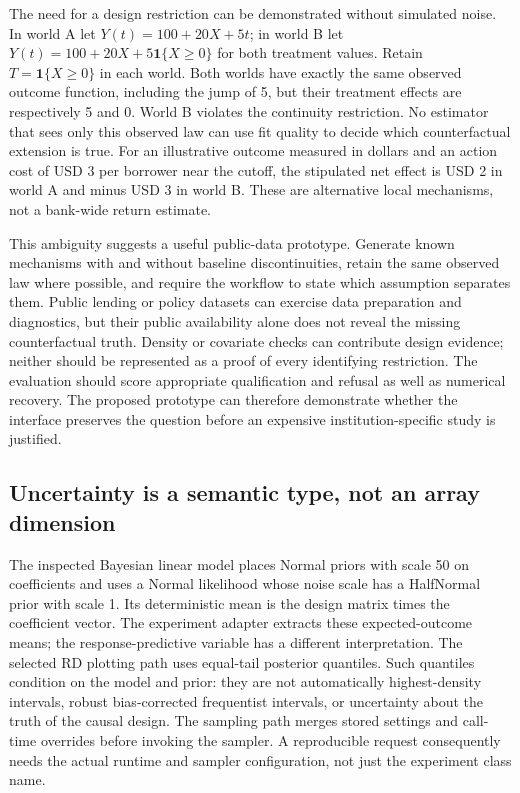The need for a design restriction can be demonstrated without simulated noise.
In world A let $Y(t)=100+20X+5t$; in world B let
$Y(t)=100+20X+5\mathbf{1}\{X\geq0\}$ for both treatment values. Retain
$T=\mathbf{1}\{X\geq0\}$ in each world. Both worlds have exactly the same
observed outcome function, including the jump of 5, but their treatment effects
are respectively 5 and 0. World B violates the continuity restriction. No
estimator that sees only this observed law can use fit quality to decide which
counterfactual extension is true. For an illustrative outcome measured in dollars
and an action cost of USD 3 per borrower near the cutoff, the stipulated net
effect is USD 2 in world A and minus USD 3 in world B. These are alternative
local mechanisms, not a bank-wide return estimate.~\citep{exec14_causalpy_exact}

This ambiguity suggests a useful public-data prototype. Generate known mechanisms
with and without baseline discontinuities, retain the same observed law where
possible, and require the workflow to state which assumption separates them.
Public lending or policy datasets can exercise data preparation and diagnostics,
but their public availability alone does not reveal the missing counterfactual
truth. Density or covariate checks can contribute design evidence; neither should
be represented as a proof of every identifying restriction. The evaluation should
score appropriate qualification and refusal as well as numerical recovery.
The proposed prototype can therefore demonstrate whether the interface preserves
the question before an expensive institution-specific study is justified.
\citep{exec14_causalpy_decision}

\subsection{Uncertainty is a semantic type, not an array dimension}

The inspected Bayesian linear model places Normal priors with scale 50 on
coefficients and uses a Normal likelihood whose noise scale has a HalfNormal
prior with scale 1. Its deterministic mean is the design matrix times the
coefficient vector. The experiment adapter extracts these expected-outcome means;
the response-predictive variable has a different interpretation. The selected RD
plotting path uses equal-tail posterior quantiles. Such quantiles condition on the
model and prior: they are not automatically highest-density intervals, robust
bias-corrected frequentist intervals, or uncertainty about the truth of the causal
design. The sampling path merges stored settings and call-time overrides before
invoking the sampler. A reproducible request consequently needs the actual runtime
and sampler configuration, not just the experiment class name.
\citep{exec14_causalpy_primary}

